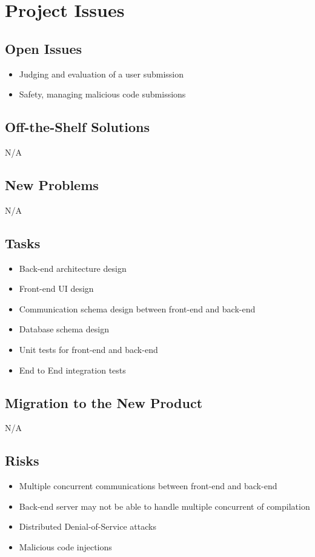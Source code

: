 \documentclass[12pt, titlepage]{article}
\begin{document}
\section{Project Issues}

\subsection{Open Issues} 
\begin{itemize} 
    \item Judging and evaluation of a user submission
    \item Safety, managing malicious code submissions
\end{itemize}

\subsection{Off-the-Shelf Solutions}
N/A

\subsection{New Problems}
N/A

\subsection{Tasks}
\begin{itemize} 
    \item Back-end architecture design
    \item Front-end UI design
    \item Communication schema design between front-end and back-end
    \item Database schema design
    \item Unit tests for front-end and back-end
    \item End to End integration tests
\end{itemize}

\subsection{Migration to the New Product}
N/A

\subsection{Risks}
\begin{itemize}
    \item Multiple concurrent communications between front-end and back-end
    \item Back-end server may not be able to handle multiple concurrent of compilation
    \item Distributed Denial-of-Service attacks
    \item Malicious code injections
\end{itemize}
\end{document}
